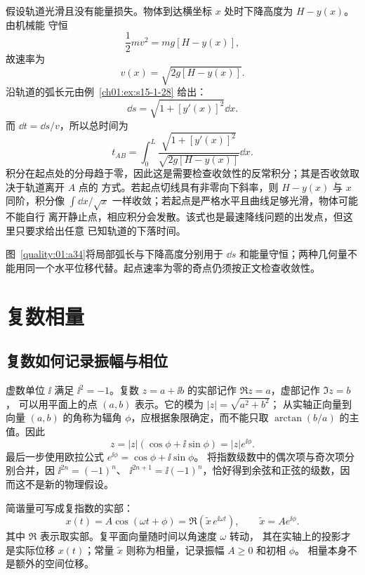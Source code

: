 {\begin{xesolution}
假设轨道光滑且没有能量损失。物体到达横坐标 $x$ 处时下降高度为 $H-y(x)$。由机械能
守恒
\[
 \frac12mv^2=mg[H-y(x)],
\]
故速率为
\[
 v(x)=\sqrt{2g[H-y(x)]}.
\]
沿轨道的弧长元由例~\ref{ch01:ex:s15-1-28} 给出：
\[
 \dd s=\sqrt{1+[y'(x)]^2}\dd x.
\]
而 $\dd t=\dd s/v$，所以总时间为
\[
 \boxed{t_{AB}=\int_0^L
 \frac{\sqrt{1+[y'(x)]^2}}
 {\sqrt{2g[H-y(x)]}}\dd x}.
\]
积分在起点处的分母趋于零，因此这是需要检查收敛性的反常积分；其是否收敛取决于轨道离开 $A$ 点的
方式。若起点切线具有非零向下斜率，则 $H-y(x)$ 与 $x$ 同阶，积分像
$\int\dd x/\sqrt{x}$ 一样收敛；若起点是严格水平且曲线足够光滑，物体可能不能自行
离开静止点，相应积分会发散。该式也是最速降线问题的出发点，但这里只要求给出任意
已知轨道的下落时间。

图~\ref{quality:01:a34}将局部弧长与下降高度分别用于 $\dd s$ 和能量守恒；两种几何量不能用同一个水平位移代替。起点速率为零的奇点仍须按正文检查收敛性。
\end{xesolution}
}

\section{复数相量}

\subsection{复数如何记录振幅与相位}
虚数单位 $\ii$ 满足 $\ii^2=-1$。复数 $z=a+\ii b$ 的实部记作 $\Re z=a$，虚部记作 $\Im z=b$，
可以用平面上的点 $(a,b)$ 表示。它的模为 $|z|=\sqrt{a^2+b^2}$；
从实轴正向量到向量 $(a,b)$ 的角称为辐角 $\phi$，应根据象限确定，而不能只取
$\arctan(b/a)$ 的主值。因此
\[
 z=|z|(\cos\phi+\ii\sin\phi)=|z|e^{\ii\phi}.
\]
最后一步使用欧拉公式 $e^{\ii\phi}=\cos\phi+\ii\sin\phi$。
将指数级数中的偶次项与奇次项分别合并，因 $\ii^{2n}=(-1)^n$、
$\ii^{2n+1}=\ii(-1)^n$，恰好得到余弦和正弦的级数，因而这不是新的物理假设。

简谐量可写成复指数的实部：
\begin{equation}
 x(t)=A\cos(\omega t+\phi)=\Re\!\left(\widetilde x\,e^{\ii\omega t}\right),
 \qquad \widetilde x=Ae^{\ii\phi}.
\end{equation}
其中 $\Re$ 表示取实部。复平面向量随时间以角速度 $\omega$ 转动，
其在实轴上的投影才是实际位移 $x(t)$；常量 $\widetilde x$ 则称为相量，记录振幅 $A\ge0$ 和初相 $\phi$。
相量本身不是额外的空间位移。


